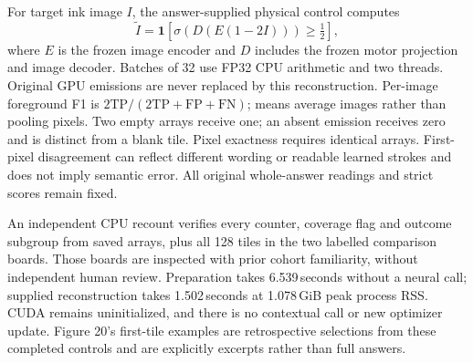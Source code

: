 \documentclass[12pt,a4paper]{article}
\providecommand{\DIFadd}[1]{{\protect\color{blue} \sf #1}} %
\begin{document}
\DIFadd{For target ink image $I$, the answer-supplied physical control computes
}\[
 \widetilde I=\mathbf 1\!\left[
 \sigma\!\left(D(E(1-2I))\right)\geq\tfrac12\right],
\]
\DIFadd{where $E$ is the frozen image encoder and $D$ includes the frozen motor
projection and image decoder. Batches of 32 use FP32 CPU arithmetic and two
threads. Original GPU emissions are never replaced by this reconstruction.
Per-image foreground F1 is $2\mathrm{TP}/(2\mathrm{TP}+\mathrm{FP}+\mathrm{FN})$;
means average images rather than pooling pixels. Two empty arrays receive one;
an absent emission receives zero and is distinct from a blank tile. Pixel
exactness requires identical arrays. First-pixel disagreement can reflect
different wording or readable learned strokes and does not imply semantic
error. All original whole-answer readings and strict scores remain fixed.
}

\DIFadd{An independent CPU recount verifies every counter, coverage flag and outcome
subgroup from saved arrays, plus all 128 tiles in the two labelled comparison
boards. Those boards are inspected with prior cohort familiarity, without
independent human review. Preparation takes 6.539\,seconds without a neural call;
supplied reconstruction takes 1.502\,seconds at 1.078\,GiB peak process RSS. CUDA
remains uninitialized, and there is no contextual call or new optimizer
update. Figure 20's first-tile examples are retrospective selections from
these completed controls and are explicitly excerpts rather than full answers.
}
\end{document}
